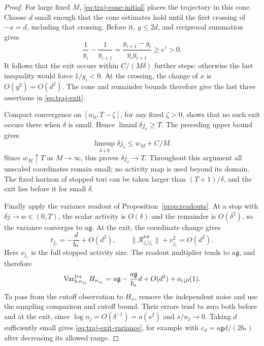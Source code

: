 \begin{proof}
For large fixed \(M\), \eqref{eq:traj-cone-initial} places the
trajectory in this cone.  Choose \(d\) small enough that the cone
estimates hold until the first crossing of \(-x=d\), including
that crossing.  Before it, \(y\le2d\), and reciprocal summation
gives
\[
 \frac1{y_i}-\frac1{y_{i+1}}
   =\frac{y_{i+1}-y_i}{y_iy_{i+1}}\ge c'>0.
\]
It follows that the exit occurs within \(C/(M\delta)\) further
steps: otherwise the last inequality would force \(1/y_i<0\).
At the crossing, the change of \(x\) is \(O(y^2)=O(d^2)\).
The cone and remainder bounds therefore give the last three
assertions in \eqref{eq:traj-exit}.

Compact convergence on \([w_0,T-\zeta]\), for any fixed
\(\zeta>0\), shows that no such exit occurs there when
\(\delta\) is small.  Hence \(\liminf\delta j_e\ge T\).
The preceding upper bound gives
\[
 \limsup_{\delta\downarrow0}\delta j_e\le w_M+C/M.
\]
Since \(w_M\uparrow T\) as \(M\to\infty\), this proves
\(\delta j_e\to T\).  Throughout this argument all unscaled
coordinates remain small; no activity map is used beyond its
domain.  The fixed horizon of stopped tori can be taken larger
than \((T+1)/\delta\), and the exit lies before it for small
\(\delta\).

Finally apply the variance readout of
Proposition~\ref{prop:readouts}.  At a stop with
\(\delta j\to w\in(0,T)\), the scalar activity is \(O(\delta)\)
and the remainder is \(O(\delta^2)\), so the variance converges
to \(a\mathfrak g\).  At the exit, the coordinate change gives
\[
 t_{j_e}=-\frac d{b_*}+O(d^2),\qquad
 \|\mathcal R_{j_e|j_e}^{\mathrm{tor}}\|+\nu_{j_e}^2=O(d^2).
\]
Here \(\nu_{j_e}\) is the full stopped activity size.  The
readout multiplier tends to \(a\mathfrak g\), and therefore
\[
 \operatorname{Var}_{b,n_{j_e}}^{\mathrm{tor}}H_{n_{j_e}}
     =a\mathfrak g-\frac{a\mathfrak g}{b_*}d
                        +O(d^2)+o_{\varepsilon\downarrow0}(1).
\]
To pass from the cutoff observation to \(H_n\), remove the
independent noise and use the sampling comparison and cutoff
bound.  Their errors tend to zero both before and at the exit,
since \(\log n_j=O(\delta^{-1})=o(s^2)\) and \(s/n_j\to0\).
Taking \(d\) sufficiently small gives
\eqref{eq:traj-exit-variance}, for example with
\(c_d=a\mathfrak g d/(2b_*)\) after decreasing its allowed range.
\end{proof}
